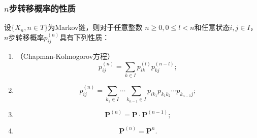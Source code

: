 \begin{frame}
    \frametitle{$n$步转移概率的性质}
    \begin{mytheorem}[$n$步转移概率的性质]
        设$\{X_n,n\in T\}$为Markov链，则对于任意整数
        $n\geqslant 0,0\leqslant l<n$和任意状态$i,j\in I$，
        $n$步转移概率$p_{ij}^{(n)}$具有下列性质：
        \begin{small}
        \begin{enumerate}
            \item （Chapman-Kolmogorov方程）
            \begin{equation}
                p_{ij}^{(n)}=\sum_{k\in I}p_{ik}^{(l)}p_{kj}^{(n-l)};
            \end{equation}
            \item \begin{equation*}
                p_{ij}^{(n)}=\sum_{k_1\in I}\cdots\sum_{k_{n-1}\in I}p_{ik_1}p_{k_1k_2}\cdots p_{k_{n-1}j};
            \end{equation*}
            \item \begin{equation}
                \bm P^{(n)}=\bm P\cdot \bm P^{(n-1)};
            \end{equation}
            \item \begin{equation}
                \bm P^{(n)}=\bm P^n.
            \end{equation}
        \end{enumerate}
        \end{small}
    \end{mytheorem}
\end{frame}

